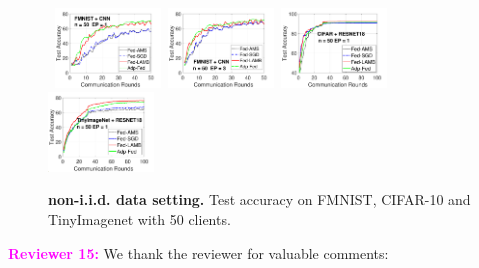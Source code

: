 \documentclass{article}
\begin{document}
\begin{figure}[H]
    \begin{center}
        \mbox{
                \hspace{-0.1in}\includegraphics[width=0.25\textwidth]{new_fmnist_mnist_fig/fmnist_testerror_cnn_ep1_iid0_reddi.pdf}
        \hspace{-0.1in}\includegraphics[width=0.25\textwidth]{new_fmnist_mnist_fig/fmnist_testerror_cnn_ep3_iid0_reddi.pdf}
        \hspace{-0.05in}\includegraphics[width=0.25\textwidth]{new_fmnist_mnist_fig/cifar_testerror_resnet18_ep1_client2_iid0_reddi.pdf}
        \hspace{-0.1in}\includegraphics[width=0.25\textwidth]{new_fmnist_mnist_fig/tinyimagenet_testerror_resnet18_ep1_client2_iid0_reddi.pdf}\hspace{-0.1in}
        }
    \end{center}
	\caption{\textbf{non-i.i.d. data setting.} Test accuracy on FMNIST, CIFAR-10 and TinyImagenet with 50 clients.}
	\label{fig:noniidresnet18}
\end{figure}

\vspace{-0.1in}

\textbf{\textcolor{magenta}{Reviewer 15:}} We thank the reviewer for valuable comments:\vspace{-5pt}
\end{document}
